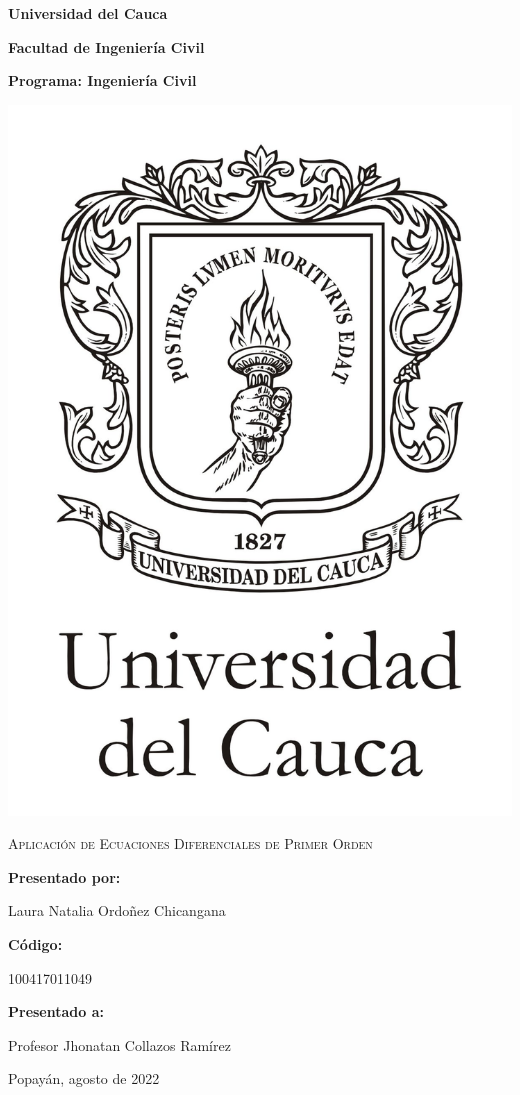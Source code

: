 \documentclass[12pt]{report}
\begin{document}
\begin{titlepage}
\centering
{\bfseries\LARGE Universidad del Cauca \par}
\vspace{0.1cm}
{\bfseries\LARGE Facultad de Ingeniería Civil \par}
\vspace{0.1cm}
{\bfseries\LARGE Programa: Ingeniería Civil \par}
\vspace{0.2cm}

\includegraphics[scale=0.3]{ESCUDO UC.jpg}

{\scshape\Huge Aplicación de Ecuaciones Diferenciales de Primer Orden \par}
\vspace{1cm}

{\bfseries\Large Presentado por: \par}
{\Large Laura Natalia Ordoñez Chicangana \par}
{\bfseries\Large Código: \par}
{\Large 100417011049 \par}
{\bfseries\Large Presentado a: \par}
{\Large Profesor Jhonatan Collazos Ramírez \par}

\vfill
{\Large Popayán, agosto de 2022 \par}
\end{titlepage}
\newpage
\end{document}
